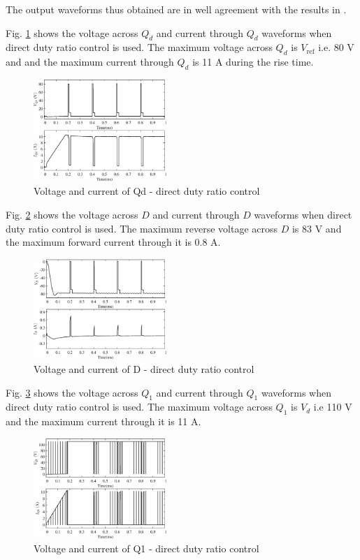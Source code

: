 \documentclass[a4paper]{IEEEtran}
\begin{document}
	The output waveforms thus obtained are in well agreement with the results in \cite{tastekin2009novel}.

	Fig. \ref{fig:sim-qd} shows the voltage across $Q_d$ and current through $Q_d$ waveforms when direct duty ratio control is used. The maximum voltage across $Q_d$ is $V_{\text{ref}}$ i.e. 80 V and and the maximum current through $Q_d$ is 11 A during the rise time.

	\begin{figure}
		\centering
		\includegraphics[width=0.45\textwidth]{Qd}
		\caption{Voltage and current of Qd - direct duty ratio control}
		\label{fig:sim-qd}
	\end{figure}

	Fig. \ref{fig:sim-d} shows the voltage across $D$ and current through $D$ waveforms when direct duty ratio control is used. The maximum reverse voltage across $D$ is 83 V and the maximum forward current through it is 0.8 A.

	\begin{figure}
		\centering
		\includegraphics[width=0.45\textwidth]{D}
		\caption{Voltage and current of D - direct duty ratio control}
		\label{fig:sim-d}
	\end{figure}

	Fig. \ref{fig:sim-q1} shows the voltage across $Q_1$ and current through $Q_1$ waveforms when direct duty ratio control is used. The maximum voltage across $Q_1$ is $V_d$ i.e 110 V and the maximum current through it is 11 A.

	\begin{figure}
		\centering
		\includegraphics[width=0.45\textwidth]{Q1}
		\caption{Voltage and current of Q1 - direct duty ratio control}
		\label{fig:sim-q1}
	\end{figure}
\end{document}
